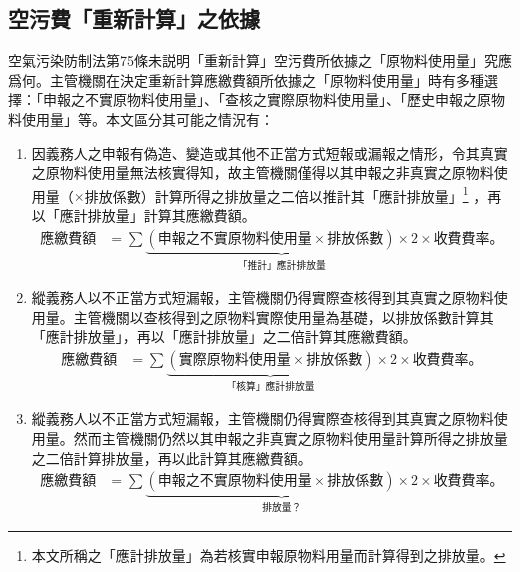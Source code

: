 \documentclass[11pt,a4paper]{article}
\begin{document}
\subsection{空污費「重新計算」之依據}
空氣污染防制法第75條未説明「重新計算」空污費所依據之「原物料使用量」究應爲何。主管機關在決定重新計算應繳費額所依據之「原物料使用量」時有多種選擇：「申報之不實原物料使用量」、「查核之實際原物料使用量」、「歷史申報之原物料使用量」等。本文區分其可能之情況有：
\begin{enumerate}
   \item 因義務人之申報有偽造、變造或其他不正當方式短報或漏報之情形，令其真實之原物料使用量無法核實得知，故主管機關僅得以其申報之非真實之原物料使用量（$\times $排放係數）計算所得之排放量之二倍以推計其「應計排放量」\footnote{本文所稱之「應計排放量」為若核實申報原物料用量而計算得到之排放量。}
   ，再以「應計排放量」計算其應繳費額。
   \begin{equation*}
      \begin{aligned}
         \text{應繳費額}
         &=\sum \underbrace{\left(\text{申報之不實原物料使用量}\times\text{排放係數}\right)\times 2}_{\textstyle\text{「推計」應計排放量}}\times
         \text{收費費率。}
      \end{aligned}
      \end{equation*}
   \item 縱義務人以不正當方式短漏報，主管機關仍得實際查核得到其真實之原物料使用量。主管機關以查核得到之原物料實際使用量為基礎，以排放係數計算其「應計排放量」，再以「應計排放量」之二倍計算其應繳費額。
   \begin{equation*}
      \begin{aligned}
         \text{應繳費額}
         &=\sum \underbrace{\left(\text{實際原物料使用量}\times\text{排放係數}\right)}_{\textstyle\text{「核算」應計排放量}}\times 2\times
         \text{收費費率。}
      \end{aligned}
      \end{equation*}
      \item 縱義務人以不正當方式短漏報，主管機關仍得實際查核得到其真實之原物料使用量。然而主管機關仍然以其申報之非真實之原物料使用量計算所得之排放量之二倍計算排放量，再以此計算其應繳費額。
      \begin{equation*}
         \begin{aligned}
            \text{應繳費額}
            &=\sum \underbrace{\left(\text{申報之不實原物料使用量}\times\text{排放係數}\right)\times 2}_{\textstyle\text{排放量？}}\times
            \text{收費費率。}
         \end{aligned}

\end{equation*}
\end{enumerate}
\end{document}
